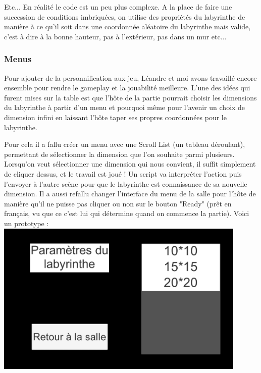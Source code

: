 \documentclass{article}
\begin{document}
Etc... En réalité le code est un peu plus complexe. A la place de faire une succession de conditions imbriquées, on utilise des propriétés du labyrinthe de manière à ce qu'il soit dans une coordonnée aléatoire du labyrinthe mais valide, c'est à dire à la bonne hauteur, pas à l'extérieur, pas dans un mur etc...

\subsubsection{Menus}

Pour ajouter de la personnification aux jeu, Léandre et moi avons travaillé encore ensemble pour rendre le gameplay et la jouabilité meilleure. L'une des idées qui furent mises sur la table est que l'hôte de la partie pourrait choisir les dimensions du labyrinthe à partir d’un menu et pourquoi même pour l'avenir un choix de dimension infini en laissant l'hôte taper ses propres coordonnées pour le labyrinthe. 

Pour cela il a fallu créer un menu avec une Scroll List (un tableau déroulant), permettant de sélectionner la dimension que l'on souhaite parmi plusieurs. Lorsqu'on veut sélectionner une dimension qui nous convient, il suffit simplement de cliquer dessus, et le travail est joué ! Un script va interpréter l'action puis l'envoyer à l'autre scène pour que le labyrinthe est connaissance de sa nouvelle dimension. Il a aussi refallu changer l'interface du menu de la salle pour l'hôte de manière qu'il ne puisse pas cliquer ou non sur le bouton "Ready" (prêt en français, vu que ce c'est lui qui détermine quand on commence la partie). Voici un prototype :
\\

\includegraphics[width=0.9\textwidth]{menustevetaillelabyrinthe.png}\par\vspace{0.75cm}
 
\end{document}
